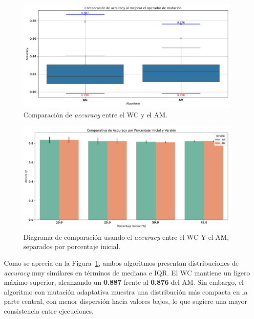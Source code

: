 \begin{figure}[htp]
    \centering
    \includegraphics[width=1\textwidth]{imagenes/evaluaciones/mutacion-adaptativa}
    \caption{Comparación de \textit{accuracy} entre el WC y el AM.}
    \label{fig:mutacion-adaptativa}
\end{figure}

\begin{figure}[htp]
    \centering
    \includegraphics[width=1\textwidth]{imagenes/evaluaciones/mutacion-adaptativa_por_porcentaje}
    \caption{Diagrama de comparación usando el \textit{accuracy} entre el WC Y el AM, separados por porcentaje inicial.}
    \label{fig:mutacion-adaptativa-porcentaje}
\end{figure}

Como se aprecia en la Figura~\ref{fig:mutacion-adaptativa},
ambos algoritmos presentan distribuciones de \textit{accuracy} muy similares en términos de mediana e IQR.
El WC mantiene un ligero máximo superior, alcanzando un \textbf{0.887} frente al \textbf{0.876} del AM.
Sin embargo, el algoritmo con mutación adaptativa muestra una distribución más compacta en la parte central,
con menor dispersión hacia valores bajos, lo que sugiere una mayor consistencia entre ejecuciones.

